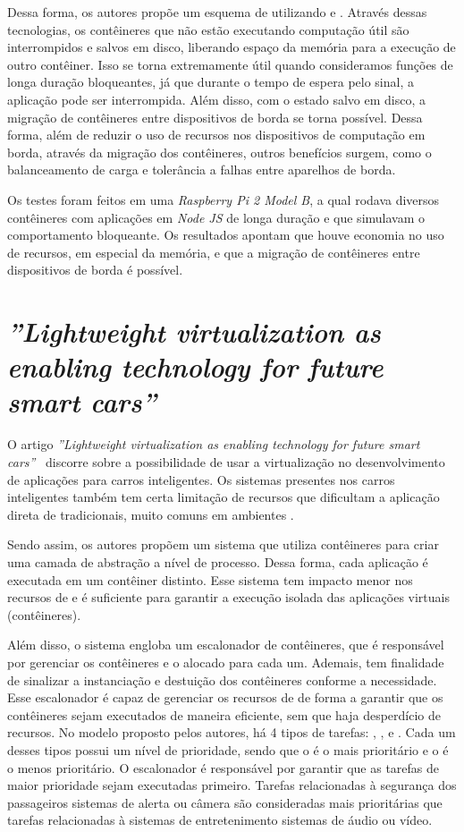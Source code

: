 Dessa forma, os autores propõe um esquema de \checkpointing utilizando \docker e \criu. Através dessas tecnologias, os contêineres que não estão executando computação útil são interrompidos e salvos em disco, liberando espaço da memória para a execução de outro contêiner. Isso se torna extremamente útil quando consideramos funções de longa duração bloqueantes, já que durante o tempo de espera pelo sinal, a aplicação pode ser interrompida. Além disso, com o estado salvo em disco, a migração de contêineres entre dispositivos \iot de borda se torna possível. Dessa forma, além de reduzir o uso de recursos nos dispositivos de computação em borda, através da migração dos contêineres, outros benefícios surgem, como o balanceamento de carga e tolerância a falhas entre aparelhos \iot de borda.

Os testes foram feitos em uma \textit{Raspberry Pi 2 Model B}, a qual rodava diversos contêineres com aplicações em \textit{Node JS} de longa duração e que simulavam o comportamento bloqueante. Os resultados apontam que houve economia no uso de recursos, em especial da memória, e que a migração de contêineres entre dispositivos \iot de borda é possível.

\section{ \textit{''Lightweight virtualization as enabling technology for future smart cars''}}

O artigo \textit{''Lightweight virtualization as enabling technology for future smart cars''}~\cite{smartcarslwvirtualization} discorre sobre a possibilidade de usar a virtualização no desenvolvimento de aplicações para carros inteligentes. Os sistemas presentes nos carros inteligentes também tem certa limitação de recursos que dificultam a aplicação direta de \hypervisors tradicionais, muito comuns em ambientes \cloud.

Sendo assim, os autores propõem um sistema que utiliza contêineres \docker para criar uma camada de abstração a nível de processo. Dessa forma, cada aplicação é executada em um contêiner distinto. Esse sistema tem impacto menor nos recursos de \hardware e é suficiente para garantir a execução isolada das aplicações virtuais (contêineres).

Além disso, o sistema engloba um escalonador de contêineres, que é responsável por gerenciar os contêineres e o \hardware alocado para cada um. Ademais, tem finalidade de sinalizar a instanciação e destuição dos contêineres conforme a necessidade. Esse escalonador é capaz de gerenciar os recursos de \hardware de forma a garantir que os contêineres sejam executados de maneira eficiente, sem que haja desperdício de recursos. No modelo proposto pelos autores, há 4 tipos de tarefas: \critical, \high, \moderate e \low. Cada um desses tipos possui um nível de prioridade, sendo que o \critical é o mais prioritário e o \low é o menos prioritário. O escalonador é responsável por garantir que as tarefas de maior prioridade sejam executadas primeiro. Tarefas relacionadas à segurança dos passageiros \eg sistemas de alerta ou câmera são consideradas mais prioritárias que tarefas relacionadas à sistemas de entretenimento \eg sistemas de áudio ou vídeo.

